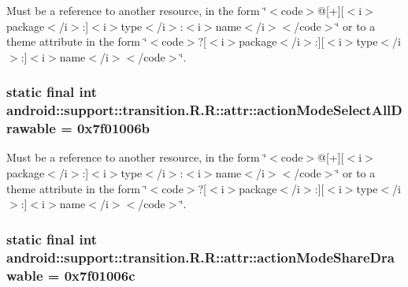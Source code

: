 Must be a reference to another resource, in the form \char`\"{}$<$code$>$@\mbox{[}+\mbox{]}\mbox{[}$<$i$>$package$<$/i$>$:\mbox{]}$<$i$>$type$<$/i$>$:$<$i$>$name$<$/i$>$$<$/code$>$\char`\"{} or to a theme attribute in the form \char`\"{}$<$code$>$?\mbox{[}$<$i$>$package$<$/i$>$:\mbox{]}\mbox{[}$<$i$>$type$<$/i$>$:\mbox{]}$<$i$>$name$<$/i$>$$<$/code$>$\char`\"{}. \hypertarget{classandroid_1_1support_1_1transition_1_1_r_1_1attr_6ee9e9fb5de870ec16df80560d32accb}{
\subsubsection[{actionModeSelectAllDrawable}]{\setlength{\rightskip}{0pt plus 5cm}static final int android::support::transition.R.R::attr::actionModeSelectAllDrawable = 0x7f01006b}}
\label{classandroid_1_1support_1_1transition_1_1_r_1_1attr_6ee9e9fb5de870ec16df80560d32accb}


Must be a reference to another resource, in the form \char`\"{}$<$code$>$@\mbox{[}+\mbox{]}\mbox{[}$<$i$>$package$<$/i$>$:\mbox{]}$<$i$>$type$<$/i$>$:$<$i$>$name$<$/i$>$$<$/code$>$\char`\"{} or to a theme attribute in the form \char`\"{}$<$code$>$?\mbox{[}$<$i$>$package$<$/i$>$:\mbox{]}\mbox{[}$<$i$>$type$<$/i$>$:\mbox{]}$<$i$>$name$<$/i$>$$<$/code$>$\char`\"{}. \hypertarget{classandroid_1_1support_1_1transition_1_1_r_1_1attr_0631f612f456dd25a7287f38ec84b014}{
\subsubsection[{actionModeShareDrawable}]{\setlength{\rightskip}{0pt plus 5cm}static final int android::support::transition.R.R::attr::actionModeShareDrawable = 0x7f01006c}}
\label{classandroid_1_1support_1_1transition_1_1_r_1_1attr_0631f612f456dd25a7287f38ec84b014}


